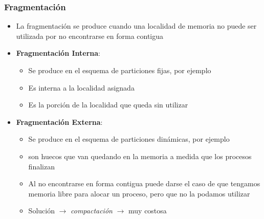 \begin{frame}
  \frametitle{\textbf{Fragmentación}}
  \begin{itemize}
  	  \item La fragmentación se produce cuando una localidad de memoria no puede ser utilizada por no encontrarse en forma contigua
	  \item \textbf{Fragmentación Interna}:
	  \begin{itemize}
	  	\item Se produce en el esquema de particiones fijas, por ejemplo
	  	\item Es interna a la localidad asignada
	  	\item Es la porción de la localidad que queda sin utilizar
	  \end{itemize}
	  \item \textbf{Fragmentación Externa}:
	  \begin{itemize}
	  	\item Se produce en el esquema de particiones dinámicas, por ejemplo
	  	\item son huecos que van quedando en la memoria a medida que los procesos finalizan
	  	\item Al no encontrarse en forma contigua puede darse el caso de que tengamos memoria libre para alocar un proceso, pero que no la podamos utilizar
	  	\item Solución $\rightarrow$ \emph{compactación} $\rightarrow$ muy costosa
	  \end{itemize}
  \end{itemize}
\end{frame}


